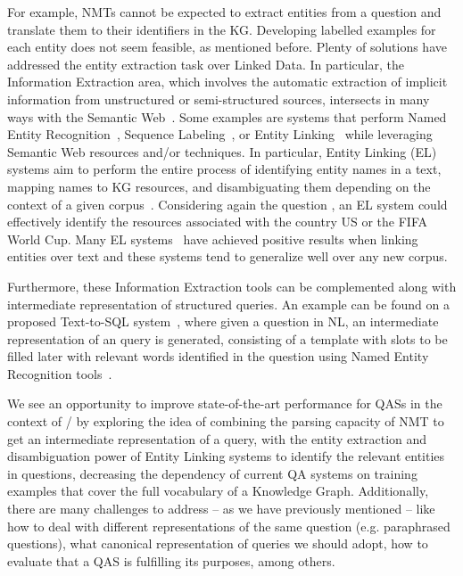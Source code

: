 For example, NMTs cannot be expected to extract entities from a question and translate them to their 
identifiers in the KG. Developing labelled examples for each entity does not seem feasible, as 
mentioned before. Plenty of solutions have addressed the entity extraction task over Linked Data. In 
particular, the Information Extraction area, which involves the automatic extraction of implicit 
information from unstructured or semi-structured sources, intersects in many ways with the 
Semantic Web~\cite{infExtr:MartinezHL19}. Some examples are systems that perform Named Entity 
Recognition~\cite{ner:LampleBSKD16}, Sequence Labeling~\cite{seqlab:MaH16, 
seqlab:contextual-emb-AkbikBV18}, or Entity Linking~\cite{EL:dbpedia-spotlight-MendesJGB11, 
EL:aida-tool-YosefHBSW11, EL:tagme-FerraginaS10, EL:opentapioca-Delpeuch19} while leveraging Semantic 
Web resources and/or techniques. In particular, Entity Linking (EL) systems aim to perform the entire 
process of identifying entity names in a text, mapping names to KG resources, and disambiguating them 
depending on the context of a given corpus~\cite{EL:survey-WuHH18}. Considering again the question 
, an EL system could effectively 
identify the resources associated with the country US or the FIFA World Cup. Many EL 
systems~\cite{EL:dbpedia-spotlight-MendesJGB11, EL:aida-tool-YosefHBSW11, EL:tagme-FerraginaS10, 
EL:opentapioca-Delpeuch19} have achieved positive results when linking entities over text and 
these systems tend to generalize well over any new corpus. 

Furthermore, these Information Extraction tools can be complemented along with intermediate 
representation of structured queries. An example can be found on a proposed 
Text-to-SQL system~\cite{semPar:txt-to-sql-RadevKZZFRS18}, where given a question in NL, an 
intermediate representation of an \SQL{} query is generated, consisting of a \SQL{} template with slots to 
be filled later with relevant words identified in the question using Named Entity Recognition 
tools~\cite{ner:dynet-NeubigDGMAABCCC17}.

We see an opportunity to improve state-of-the-art performance for QASs in the context 
of \RDF/\SPARQL{} by exploring the idea of combining the parsing capacity of NMT to get an 
intermediate representation of a \SPARQL{} query, with the entity extraction and disambiguation 
power of Entity Linking systems to identify the relevant entities in questions, decreasing 
the dependency of current QA systems on training examples that cover the full vocabulary of a 
Knowledge Graph. Additionally, there are many challenges to address – as we have previously mentioned 
– like how to deal with different representations of the same question (e.g. paraphrased questions), 
what canonical representation of \SPARQL{} queries we should adopt, how to evaluate 
that a QAS is fulfilling its purposes, among others.